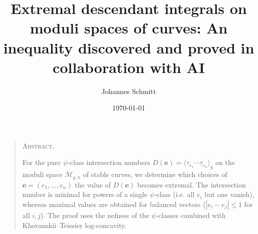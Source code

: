 \documentclass[12pt,reqno]{amsart}
\title[Extremal descendant integrals]{Extremal descendant integrals on moduli spaces of curves:
An inequality discovered and proved in collaboration with AI}
\author{Johannes Schmitt}
\date{\today}
\theoremstyle{definition}
\newcommand{\aiinline}[1]{{\color{aicolor}\uwave{#1}}}
\newenvironment{altabstract}{%
  \begin{quotation}
  \footnotesize
  \noindent\textsc{Abstract.}\enspace\ignorespaces
}{%
  \end{quotation}
}
\newcommand{\Mbar}{\overline{\mathcal{M}}}
\begin{document}
\maketitle
\begin{altabstract}
    \begin{humanparagraph}
For the pure $\psi$-class intersection numbers $D(\textbf{e})=\langle \tau_{e_1} \cdots \tau_{e_n} \rangle_g$ on the moduli space $\Mbar_{g,n}$ of stable curves, we determine \aiinline{for} which choices of $\textbf{e}=(e_1, \ldots, e_n)$ the value of $D(\textbf{e})$ becomes extremal.
The intersection number is minimal for powers of a single $\psi$-class (i.e. all $e_i$ but one vanish), whereas maximal values are obtained for balanced vectors ($|e_i - e_j| \leq 1$ for all $i,j$). The proof uses the nefness of the $\psi$-classes combined with Khovanskii--Teissier log-concavity.
\end{humanparagraph}
\end{altabstract}
\end{document}
